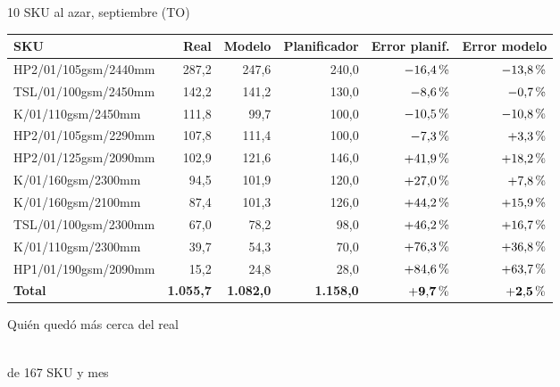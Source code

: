 \documentclass[aspectratio=169,11pt]{beamer}
\newcommand{\pc}{\mbox{\char37}}
\newcommand{\real}[1]{\textcolor{SWnavy}{#1}}
\newcommand{\modelo}[1]{\textcolor{SWcyan}{#1}}
\newcommand{\plan}[1]{\textcolor{SWgray}{#1}}
\begin{document}
\begin{frame}{10 SKU al azar, septiembre (TO)}
  \centering\footnotesize
  \setlength{\tabcolsep}{5pt}\renewcommand{\arraystretch}{1.02}\vspace{-0.4em}
  \begin{tabular}{@{}l r r r r r@{}}
    \toprule
    SKU & \real{Real} & \modelo{Modelo} & \plan{Planificador} & Error planif. & Error modelo \\
    \midrule
    HP2/01/105gsm/2440mm & 287,2 & 247,6 & 240,0 & $-16{,}4\,\pc{}$ & $-13{,}8\,\pc{}$ \\
    TSL/01/100gsm/2450mm & 142,2 & 141,2 & 130,0 & $-8{,}6\,\pc{}$ & $-0{,}7\,\pc{}$ \\
    K/01/110gsm/2450mm & 111,8 & 99,7 & 100,0 & $-10{,}5\,\pc{}$ & $-10{,}8\,\pc{}$ \\
    HP2/01/105gsm/2290mm & 107,8 & 111,4 & 100,0 & $-7{,}3\,\pc{}$ & $+3{,}3\,\pc{}$ \\
    HP2/01/125gsm/2090mm & 102,9 & 121,6 & 146,0 & $+41{,}9\,\pc{}$ & $+18{,}2\,\pc{}$ \\
    K/01/160gsm/2300mm & 94,5 & 101,9 & 120,0 & $+27{,}0\,\pc{}$ & $+7{,}8\,\pc{}$ \\
    K/01/160gsm/2100mm & 87,4 & 101,3 & 126,0 & $+44{,}2\,\pc{}$ & $+15{,}9\,\pc{}$ \\
    TSL/01/100gsm/2300mm & 67,0 & 78,2 & 98,0 & $+46{,}2\,\pc{}$ & $+16{,}7\,\pc{}$ \\
    K/01/110gsm/2300mm & 39,7 & 54,3 & 70,0 & $+76{,}3\,\pc{}$ & $+36{,}8\,\pc{}$ \\
    HP1/01/190gsm/2090mm & 15,2 & 24,8 & 28,0 & $+84{,}6\,\pc{}$ & $+63{,}7\,\pc{}$ \\
    \midrule
    \textbf{Total} & \textbf{1.055,7} & \textbf{1.082,0} & \textbf{1.158,0} & $\mathbf{+9{,}7\,\pc{}}$ & $\mathbf{+2{,}5\,\pc{}}$ \\
    \bottomrule
  \end{tabular}
\end{frame}

\begin{frame}{Quién quedó más cerca del real}
  \vspace{1.5em}
  \centering
  \\[1em]
  {\large de 167 SKU y mes}
\end{frame}
\end{document}
